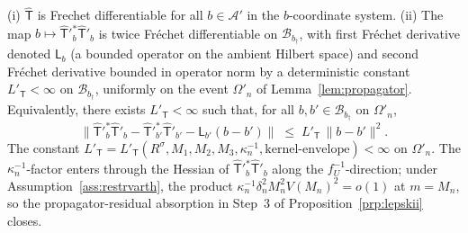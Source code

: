 \begin{assumption}\label{ass:frediff}
\textup{(i)} $\hat{\mathsf T}$ is Frechet differentiable for all
$b \in \mathcal{A}'$ in the $b$-coordinate system.
\textup{(ii)} The map $b \mapsto \hat{\mathsf T}'^{*}_{b}\hat{\mathsf T}'_{b}$
is twice Fr\'echet differentiable on $\mathcal{B}_{b_\dagger}$, with first
Fr\'echet derivative denoted $\mathsf{L}_{b}$ (a bounded operator on the
ambient Hilbert space) and second Fr\'echet derivative bounded in
operator norm by a deterministic constant $L'_{\mathsf T} < \infty$ on
$\mathcal{B}_{b_\dagger}$, uniformly on the event $\Omega'_n$ of
Lemma~\ref{lem:propagator}. Equivalently, there exists
$L'_{\mathsf T} < \infty$ such that, for all $b, b' \in \mathcal{B}_{b_\dagger}$
on $\Omega'_n$,
\[
\bigl\|\hat{\mathsf T}'^{*}_{b}\hat{\mathsf T}'_{b}
- \hat{\mathsf T}'^{*}_{b'}\hat{\mathsf T}'_{b'}
- \mathsf{L}_{b'}(b - b')\bigr\|
\;\le\; L'_{\mathsf T}\,\|b - b'\|^{2}.
\]
The constant
$L'_{\mathsf T} = L'_{\mathsf T}(R^\sigma, M_1, M_2, M_3,
\kappa_n^{-1}, \text{kernel-envelope}) < \infty$ on $\Omega'_n$.
The $\kappa_n^{-1}$-factor enters through the Hessian of
$\hat{\mathsf T}'^{*}_{b}\hat{\mathsf T}'_{b}$ along the
$f_U^{-1}$-direction; under
Assumption~\ref{ass:restrvarth}, the product
$\kappa_n^{-1}\delta_n^{2}M_n^{2}V(M_n)^{2} = o(1)$ at $m = M_n$, so
the propagator-residual absorption in Step~3 of
Proposition~\ref{prp:lepskii} closes.
\end{assumption}


